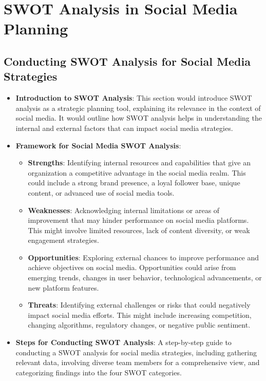 \documentclass[
]{book}
\providecommand{\tightlist}{%
  \setlength{\itemsep}{0pt}\setlength{\parskip}{0pt}}
\begin{document}
\hypertarget{swot-analysis-in-social-media-planning}{%
\chapter{SWOT Analysis in Social Media Planning}\label{swot-analysis-in-social-media-planning}}

\hypertarget{conducting-swot-analysis-for-social-media-strategies}{%
\section*{Conducting SWOT Analysis for Social Media Strategies}\label{conducting-swot-analysis-for-social-media-strategies}}

\begin{itemize}
\tightlist
\item
  \textbf{Introduction to SWOT Analysis}: This section would introduce SWOT analysis as a strategic planning tool, explaining its relevance in the context of social media. It would outline how SWOT analysis helps in understanding the internal and external factors that can impact social media strategies.
\item
  \textbf{Framework for Social Media SWOT Analysis}:

  \begin{itemize}
  \tightlist
  \item
    \textbf{Strengths}: Identifying internal resources and capabilities that give an organization a competitive advantage in the social media realm. This could include a strong brand presence, a loyal follower base, unique content, or advanced use of social media tools.
  \item
    \textbf{Weaknesses}: Acknowledging internal limitations or areas of improvement that may hinder performance on social media platforms. This might involve limited resources, lack of content diversity, or weak engagement strategies.
  \item
    \textbf{Opportunities}: Exploring external chances to improve performance and achieve objectives on social media. Opportunities could arise from emerging trends, changes in user behavior, technological advancements, or new platform features.
  \item
    \textbf{Threats}: Identifying external challenges or risks that could negatively impact social media efforts. This might include increasing competition, changing algorithms, regulatory changes, or negative public sentiment.
  \end{itemize}
\item
  \textbf{Steps for Conducting SWOT Analysis}: A step-by-step guide to conducting a SWOT analysis for social media strategies, including gathering relevant data, involving diverse team members for a comprehensive view, and categorizing findings into the four SWOT categories.
\end{itemize}
\end{document}
